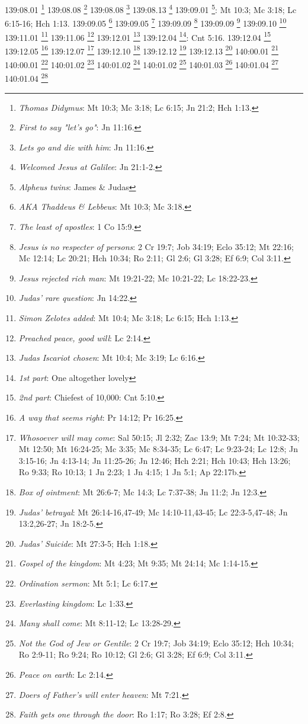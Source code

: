 {{{{{{139:08.01 \footnote{\textit{Thomas Didymus}: Mt 10:3; Mc 3:18; Lc 6:15; Jn 21:2; Hch 1:13.}
139:08.08 \footnote{\textit{First to say "let's go"}: Jn 11:16.}
139:08.08 \footnote{\textit{Lets go and die with him}: Jn 11:16.}
139:08.13 \footnote{\textit{Welcomed Jesus at Galilee}: Jn 21:1-2.}
139:09.01 \footnote{\textit{Alpheus twins}: James & Judas}: Mt 10:3; Mc 3:18; Lc 6:15-16; Hch 1:13.}
139:09.05 \footnote{\textit{AKA Thaddeus & Lebbeus}: Mt 10:3; Mc 3:18.}
139:09.05 \footnote{\textit{The least of apostles}: 1 Co 15:9.}
139:09.09 \footnote{\textit{Jesus is no respecter of persons}: 2 Cr 19:7; Job 34:19; Eclo 35:12; Mt 22:16; Mc 12:14; Lc 20:21; Hch 10:34; Ro 2:11; Gl 2:6; Gl 3:28; Ef 6:9; Col 3:11.}
139:09.09 \footnote{\textit{Jesus rejected rich man}: Mt 19:21-22; Mc 10:21-22; Lc 18:22-23.}
139:09.10 \footnote{\textit{Judas' rare question}: Jn 14:22.}
139:11.01 \footnote{\textit{Simon Zelotes added}: Mt 10:4; Mc 3:18; Lc 6:15; Hch 1:13.}
139:11.06 \footnote{\textit{Preached peace, good will}: Lc 2:14.}
139:12.01 \footnote{\textit{Judas Iscariot chosen}: Mt 10:4; Mc 3:19; Lc 6:16.}
139:12.04 \footnote{\textit{1st part}: One altogether lovely}: Cnt 5:16.}
139:12.04 \footnote{\textit{2nd part}: Chiefest of 10,000: Cnt 5:10.}
139:12.05 \footnote{\textit{A way that seems right}: Pr 14:12; Pr 16:25.}
139:12.07 \footnote{\textit{Whosoever will may come}: Sal 50:15; Jl 2:32; Zac 13:9; Mt 7:24; Mt 10:32-33; Mt 12:50; Mt 16:24-25; Mc 3:35; Mc 8:34-35; Lc 6:47; Lc 9:23-24; Lc 12:8; Jn 3:15-16; Jn 4:13-14; Jn 11:25-26; Jn 12:46; Hch 2:21; Hch 10:43; Hch 13:26; Ro 9:33; Ro 10:13; 1 Jn 2:23; 1 Jn 4:15; 1 Jn 5:1; Ap 22:17b.}
139:12.10 \footnote{\textit{Box of ointment}: Mt 26:6-7; Mc 14:3; Lc 7:37-38; Jn 11:2; Jn 12:3.}
139:12.12 \footnote{\textit{Judas' betrayal}: Mt 26:14-16,47-49; Mc 14:10-11,43-45; Lc 22:3-5,47-48; Jn 13:2,26-27; Jn 18:2-5.}
139:12.13 \footnote{\textit{Judas' Suicide}: Mt 27:3-5; Hch 1:18.}
140:00.01 \footnote{\textit{Gospel of the kingdom}: Mt 4:23; Mt 9:35; Mt 24:14; Mc 1:14-15.}
140:00.01 \footnote{\textit{Ordination sermon}: Mt 5:1; Lc 6:17.}
140:01.02 \footnote{\textit{Everlasting kingdom}: Lc 1:33.}
140:01.02 \footnote{\textit{Many shall come}: Mt 8:11-12; Lc 13:28-29.}
140:01.02 \footnote{\textit{Not the God of Jew or Gentile}: 2 Cr 19:7; Job 34:19; Eclo 35:12; Hch 10:34; Ro 2:9-11; Ro 9:24; Ro 10:12; Gl 2:6; Gl 3:28; Ef 6:9; Col 3:11.}
140:01.03 \footnote{\textit{Peace on earth}: Lc 2:14.}
140:01.04 \footnote{\textit{Doers of Father's will enter heaven}: Mt 7:21.}
140:01.04 \footnote{\textit{Faith gets one through the door}: Ro 1:17; Ro 3:28; Ef 2:8.}
}}}}
